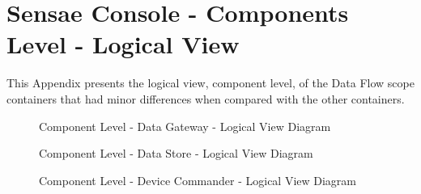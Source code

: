 \chapter{Sensae Console - Components Level - Logical View}
\label{AppendixC}

This Appendix presents the logical view, component level, of the Data Flow scope containers that had minor differences when compared with the other containers.

\begin{figure}[H]
   \centering
   \resizebox{0.6\columnwidth}{!}
   {
      
   }
   \caption[Component Level - Data Gateway - Logical View Diagram]{Component Level - Data Gateway - Logical View Diagram}
   \label{fig:AppendixC:gateway}
\end{figure}

\begin{figure}[H]
   \centering
   \resizebox{0.6\columnwidth}{!}
   {
      
   }
   \caption[Component Level - Data Store - Logical View Diagram]{Component Level - Data Store - Logical View Diagram}
   \label{fig:AppendixC:store}
\end{figure}


\begin{figure}[H]
   \centering
   \resizebox{0.7\columnwidth}{!}
   {
      
   }
   \caption[Component Level - Device Commander - Logical View Diagram]{Component Level - Device Commander - Logical View Diagram}
   \label{fig:AppendixC:commander}
\end{figure}
